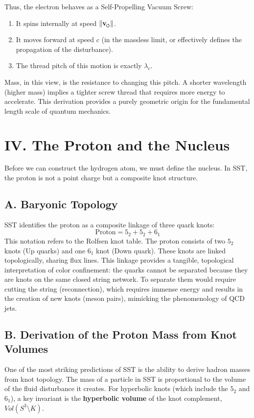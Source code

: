 \documentclass[11pt]{article}
\newcommand{\vswirl}{\mathbf{v}_{\mkern-2mu\scriptscriptstyle\boldsymbol{\circlearrowleft}}}
\begin{document}
Thus, the electron behaves as a Self-Propelling Vacuum Screw:
\begin{enumerate}
\item It spins internally at speed $\|\vswirl\|$.
\item It moves forward at speed $c$ (in the massless limit, or effectively defines the propagation of the disturbance).
    \item The thread pitch of this motion is exactly $\lambda_c$.
\end{enumerate}
Mass, in this view, is the resistance to changing this pitch. A shorter wavelength (higher mass) implies a tighter screw thread that requires more energy to accelerate. This derivation provides a purely geometric origin for the fundamental length scale of quantum mechanics.

\section*{IV. The Proton and the Nucleus}
Before we can construct the hydrogen atom, we must define the nucleus. In SST, the proton is not a point charge but a composite knot structure.

\subsection*{A. Baryonic Topology}
SST identifies the proton as a composite linkage of three quark knots:
\begin{equation}
\text{Proton} = 5_2 + 5_2 + 6_1
\end{equation}
This notation refers to the Rolfsen knot table. The proton consists of two $5_2$ knots (Up quarks) and one $6_1$ knot (Down quark). These knots are linked topologically, sharing flux lines. This linkage provides a tangible, topological interpretation of color confinement: the quarks cannot be separated because they are knots on the same closed string network. To separate them would require cutting the string (reconnection), which requires immense energy and results in the creation of new knots (meson pairs), mimicking the phenomenology of QCD jets.

\subsection*{B. Derivation of the Proton Mass from Knot Volumes}
One of the most striking predictions of SST is the ability to derive hadron masses from knot topology. The mass of a particle in SST is proportional to the volume of the fluid disturbance it creates. For hyperbolic knots (which include the $5_2$ and $6_1$), a key invariant is the \textbf{hyperbolic volume} of the knot complement, $Vol(S^3 \setminus K)$.
\end{document}
